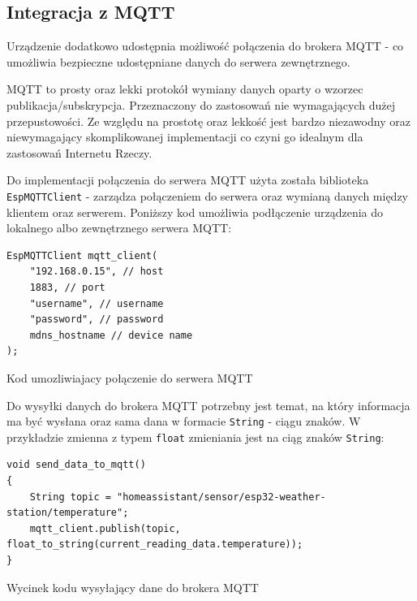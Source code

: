 \documentclass[12pt,a4paper]{article}
\begin{document}
\subsection{Integracja z MQTT}

Urządzenie dodatkowo udostępnia możliwość połączenia do brokera MQTT - co umożliwia bezpieczne udostępniane danych do serwera zewnętrznego.

MQTT to prosty oraz lekki protokół wymiany danych oparty o wzorzec publikacja/subskrypcja. Przeznaczony do zastosowań nie wymagających dużej przepustowości. Ze względu na prostotę oraz lekkość jest bardzo niezawodny oraz niewymagający skomplikowanej implementacji co czyni go idealnym dla zastosowań Internetu Rzeczy.

Do implementacji połączenia do serwera MQTT użyta została biblioteka \texttt{EspMQTTClient}\cite{esp32-mqtt-server-library} - 
zarządza połączeniem do serwera oraz wymianą danych między klientem oraz serwerem. Poniższy kod umożliwia podłączenie urządzenia do lokalnego albo zewnętrznego serwera MQTT: 
\begin{code}[H]
\begin{verbatim}
EspMQTTClient mqtt_client(
    "192.168.0.15", // host
    1883, // port
    "username", // username
    "password", // password
    mdns_hostname // device name
);
\end{verbatim}
\caption{Kod umozliwiajacy połączenie do serwera MQTT}
\label{diagnostic-data-code}
\end{code}

Do wysyłki danych do brokera MQTT potrzebny jest temat, na który informacja ma być wysłana oraz
sama dana w formacie \texttt{String} - ciągu znaków. W przykładzie zmienna z typem \texttt{float} zmieniania jest na ciąg znaków \texttt{String}:
\begin{code}[H]
\begin{verbatim}
void send_data_to_mqtt()
{
    String topic = "homeassistant/sensor/esp32-weather-station/temperature";
    mqtt_client.publish(topic, float_to_string(current_reading_data.temperature));
}
\end{verbatim}
\caption{Wycinek kodu wysyłający dane do brokera MQTT}
\label{mqtt-data-send}
\end{code}
\end{document}

